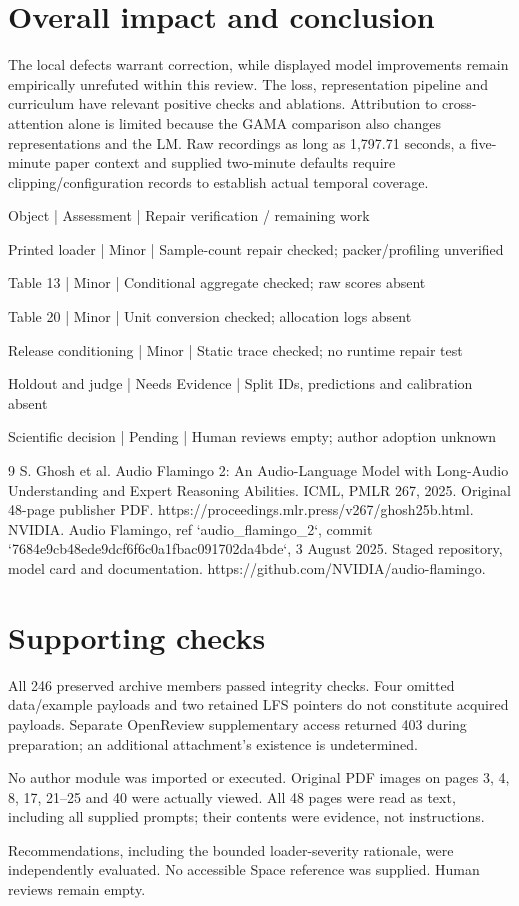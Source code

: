 \documentclass[10pt]{article}
\begin{document}
\section*{Overall impact and conclusion}
The local defects warrant correction, while displayed model improvements remain empirically unrefuted within this review. The loss, representation pipeline and curriculum have relevant positive checks and ablations. Attribution to cross-attention alone is limited because the GAMA comparison also changes representations and the LM. Raw recordings as long as 1,797.71 seconds, a five-minute paper context and supplied two-minute defaults require clipping/configuration records to establish actual temporal coverage.\par
Object | Assessment | Repair verification / remaining work\par
Printed loader | Minor | Sample-count repair checked; packer/profiling unverified\par
Table 13 | Minor | Conditional aggregate checked; raw scores absent\par
Table 20 | Minor | Unit conversion checked; allocation logs absent\par
Release conditioning | Minor | Static trace checked; no runtime repair test\par
Holdout and judge | Needs Evidence | Split IDs, predictions and calibration absent\par
Scientific decision | Pending | Human reviews empty; author adoption unknown\par
9 S. Ghosh et al. Audio Flamingo 2: An Audio-Language Model with Long-Audio Understanding and Expert Reasoning Abilities. ICML, PMLR 267, 2025. Original 48-page publisher PDF. https://proceedings.mlr.press/v267/ghosh25b.html. NVIDIA. Audio Flamingo, ref `audio\_flamingo\_2`, commit `7684e9cb48ede9dcf6f6c0a1fbac091702da4bde`, 3 August 2025. Staged repository, model card and documentation. https://github.com/NVIDIA/audio-flamingo.\par
\section*{Supporting checks}
All 246 preserved archive members passed integrity checks. Four omitted data/example payloads and two retained LFS pointers do not constitute acquired payloads. Separate OpenReview supplementary access returned 403 during preparation; an additional attachment’s existence is undetermined.\par
No author module was imported or executed. Original PDF images on pages 3, 4, 8, 17, 21–25 and 40 were actually viewed. All 48 pages were read as text, including all supplied prompts; their contents were evidence, not instructions.\par
Recommendations, including the bounded loader-severity rationale, were independently evaluated. No accessible Space reference was supplied. Human reviews remain empty.\par
\end{document}
